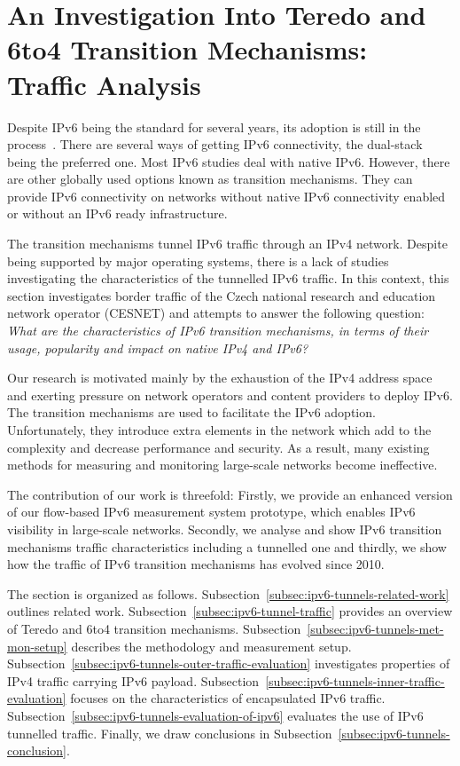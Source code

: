 
\section{An Investigation Into Teredo and 6to4 Transition Mechanisms: Traffic Analysis}\label{sec:analysis-ipv6-transition}

Despite IPv6 being the standard for several years, its adoption is still in the process~\cite{Claffy-2011-Tracking}. There are several ways of getting IPv6 connectivity, the dual-stack being the preferred one. Most IPv6 studies deal with native IPv6. However, there are other globally used options known as transition mechanisms. They can provide IPv6 connectivity on networks without native IPv6 connectivity enabled or without an IPv6 ready infrastructure.

The transition mechanisms tunnel IPv6 traffic through an IPv4 network. Despite being supported by major operating systems, there is a lack of studies investigating the characteristics of the tunnelled IPv6 traffic. In this context, this section investigates border traffic of the Czech national research and education network operator (CESNET) and attempts to answer the following question: \emph{What are the characteristics of IPv6 transition mechanisms, in terms of their usage, popularity and impact on native IPv4 and IPv6?}

Our research is motivated mainly by the exhaustion of the IPv4 address space and exerting pressure on network operators and content providers to deploy IPv6. The transition mechanisms are used to facilitate the IPv6 adoption. Unfortunately, they introduce extra elements in the network which add to the complexity and decrease performance and security. As a result, many existing methods for measuring and monitoring large-scale networks become ineffective.

The contribution of our work is threefold: Firstly, we provide an enhanced version of our flow-based IPv6 measurement system prototype, which enables IPv6 visibility in large-scale networks. Secondly, we analyse and show IPv6 transition mechanisms traffic characteristics including a tunnelled one and thirdly, we show how the traffic of IPv6 transition mechanisms has evolved since 2010.

The section is organized as follows. Subsection~\ref{subsec:ipv6-tunnels-related-work} outlines related work. Subsection~\ref{subsec:ipv6-tunnel-traffic} provides an overview of Teredo and 6to4 transition mechanisms. Subsection~\ref{subsec:ipv6-tunnels-met-mon-setup} describes the methodology and measurement setup. Subsection~\ref{subsec:ipv6-tunnels-outer-traffic-evaluation} investigates properties of IPv4 traffic carrying IPv6 payload. Subsection~\ref{subsec:ipv6-tunnels-inner-traffic-evaluation} focuses on the characteristics of encapsulated IPv6 traffic. Subsection~\ref{subsec:ipv6-tunnels-evaluation-of-ipv6} evaluates the use of IPv6 tunnelled traffic. Finally, we draw conclusions in Subsection~\ref{subsec:ipv6-tunnels-conclusion}.

